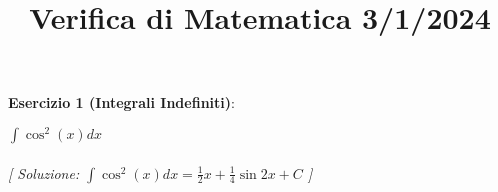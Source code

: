 \documentclass{article}
\title{\raggedright Verifica di Matematica  3/1/2024}
\date{}
\begin{document}
\maketitle

\textbf{Esercizio 1 (Integrali Indefiniti)}:\\
\par $\int \cos^2 (x)  dx$ \\\\

\textit{[ Soluzione: $\int \cos^2 (x)  dx = \frac{1}{2}x + \frac{1}{4}\sin 2x + C$ ]}\\\\
\end{document}
